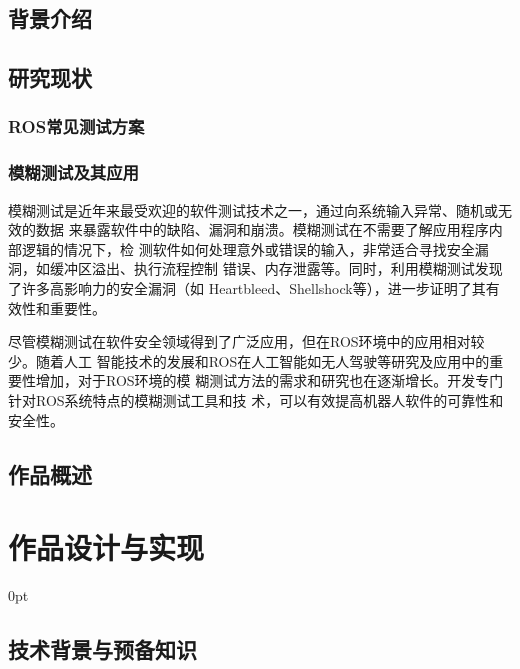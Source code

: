 \documentclass[zihao=-4]{ctexart}
\newcommand{\setParDis}{\setlength {\parskip} {0pt} }
\begin{document}
\begin{spacing}{1.5} %


\subsection{背景介绍} %


\subsection{研究现状}

\subsubsection{ROS常见测试方案}


\subsubsection{模糊测试及其应用}
模糊测试是近年来最受欢迎的软件测试技术之一，通过向系统输入异常、随机或无效的数据
来暴露软件中的缺陷、漏洞和崩溃。模糊测试在不需要了解应用程序内部逻辑的情况下，检
测软件如何处理意外或错误的输入，非常适合寻找安全漏洞，如缓冲区溢出、执行流程控制
错误、内存泄露等。同时，利用模糊测试发现了许多高影响力的安全漏洞（如
Heartbleed、Shellshock等），进一步证明了其有效性和重要性。

尽管模糊测试在软件安全领域得到了广泛应用，但在ROS环境中的应用相对较少。随着人工
智能技术的发展和ROS在人工智能如无人驾驶等研究及应用中的重要性增加，对于ROS环境的模
糊测试方法的需求和研究也在逐渐增长。开发专门针对ROS系统特点的模糊测试工具和技
术，可以有效提高机器人软件的可靠性和安全性。

\subsection{作品概述}



\section{作品设计与实现}
\setParDis %

\subsection{技术背景与预备知识} %





\end{spacing}
\end{document}
